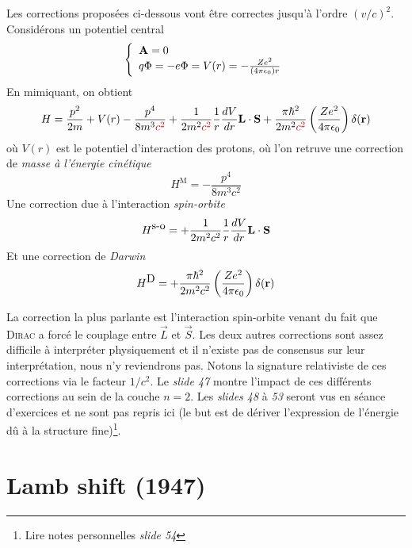 Les corrections proposées ci-dessous vont être correctes jusqu'à l'ordre $(v/c)^2$. Considérons un
potentiel central
\begin{equation}
\left\{
\begin{array}{l}
{\bf A } = 0 \\
q \Phi = - e \Phi = V(r) = -\frac{Ze^2}{(4 \pi \epsilon_0) r}
\end{array} \right.
\end{equation}
En mimiquant, on obtient
\begin{equation}
H = \frac{p^2}{2m} + V(r)- \frac{p^4}{8 m^3 {\color{red} c^2}} 
+ \frac{1}{2m^2 {\color{red} c^2}} \frac{1}{r}
  \frac{dV}{dr} {\bf L} \cdot {\bf S} 
 + \frac{\pi \hbar^2}{2 m^2 {\color{red} c^2 } }
  \left( \frac{Ze^2}{4 \pi \epsilon_0} \right) \delta( {\bf r} )
\end{equation}
où $V(r)$ est le potentiel d'interaction des protons, où l'on retruve une correction de \textit{masse
à l'énergie cinétique}
\begin{equation}
H^{\mbox{M}} = - \frac{p^4}{8 m^3 c^2}
\end{equation}
Une correction due à l'interaction \textit{spin-orbite}
\begin{equation}
H^{\mbox{s-o}} = + \frac{1}{2m^2 c^2} \frac{1}{r}
  \frac{dV}{dr} {\bf L} \cdot {\bf S} 
\end{equation}
Et une correction de \textit{Darwin}
\begin{equation}
H^{\mbox{D}} = 
 + \frac{\pi \hbar^2}{2 m^2 c^2 } 
  \left( \frac{Ze^2}{4 \pi \epsilon_0} \right) \delta( {\bf r} )
\end{equation}

La correction la plus parlante est l'interaction spin-orbite venant du fait que \textsc{Dirac} a 
forcé le couplage entre $\vec{L}$ et $\vec S$. Les deux autres corrections sont assez difficile à 
interpréter physiquement et il n'existe pas de consensus sur leur interprétation, nous n'y reviendrons
pas. Notons la signature relativiste de ces corrections via le facteur $1/c^2$. Le \textit{slide 47}
montre l'impact de ces différents corrections au sein de la couche $n=2$. Les \textit{slides 48} à
\textit{53} seront vus en séance d'exercices et ne sont pas repris ici (le but est de dériver
l'expression de l'énergie dû à la structure fine)\footnote{Lire notes personnelles \textit{slide 54}}.




\section{Lamb shift (1947)}
